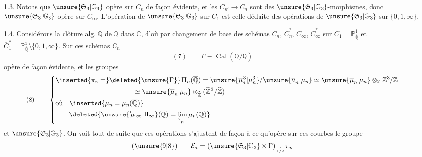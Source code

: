 1.3. Notons que $\unsure{\mathfrak S_3|\mathbb G_3}$ opère sur $C_n$ de façon évidente,
et les $C_{n'}\longrightarrow C_n$ sont des $\unsure{\mathfrak S_3|\mathbb G_3}$-morphismes,
donc $\unsure{\mathfrak S_3|\mathbb G_3}$ opère sur $C_\infty$.
L'opération de $\unsure{\mathfrak S_3|\mathbb G_3}$ sur $C_1$ 
est celle déduite des opérations de $\unsure{\mathfrak S_3|\mathbb G_3}$ sur $\{0,1,\infty\}$.

1.4. Considérons la clôture alg. $\overline{\mathbb Q}$ de $\mathbb Q$ dans $\mathbb C$,
d'où par changement de base des schémas $\overline C_n$, $\overline C_n^*$,
$\overline C_\infty$, $\overline C_\infty^*$ sur $\overline C_1=\mathbb P^1_{\overline{\mathbb Q}}$
et $\overline C_1^*=\mathbb P^1_{\overline{\mathbb Q}}\setminus\{0,1,\infty\}$.
Sur ces schémas $C_n$
\[
(7)\qquad\Gamma=\operatorname{Gal}(\overline{\mathbb Q}/\mathbb Q)
\]
opère de façon évidente, et  les groupes
\[
(8)\qquad\left\{\begin{aligned}
&\inserted{\pi_n=}\deleted{\unsure{\Gamma}}\,
\Pi_n(\overline{\mathbb Q})=
\unsure{\overline\mu_n^{\,3}|\mu_n^3}/\unsure{\overline\mu_n|\mu_n}
\simeq\unsure{\overline\mu_n|\mu_n}\otimes_{\mathbb Z}\mathbb Z^3/\mathbb Z\\
&\hspace{4cm}\simeq\unsure{\overline\mu_n|\mu_n}\otimes_{\widehat{\mathbb Z}}
(\widehat{\mathbb Z}^{\,3}/\widehat{\mathbb Z})\\
&\text{où}\quad\inserted{\mu_n=\mu_n(\overline{\mathbb Q})}\\
&\qquad\deleted{\unsure{\overleftarrow\mu_\infty|\Pi_\infty}(\overline{\mathbb Q})=
\varprojlim_n\mu_n(\overline{\mathbb Q})}
\end{aligned}\right.
\]
et $\unsure{\mathfrak S_3|\mathbb G_3}$. On voit tout de suite que ces opérations
s'ajustent de façon à ce qu'opère sur ces courbes le groupe
\[
(\unsure{9|8})\qquad\mathcal E_n=
(\unsure{\mathfrak S_3|\mathbb G_3}\times\Gamma)
\mathbin{\underset{\scriptscriptstyle 1/2}{.}}\pi_n
\]
